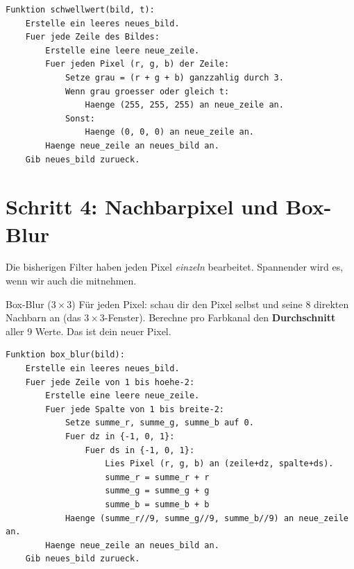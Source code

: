 \begin{lstlisting}[style=pseudo]
Funktion schwellwert(bild, t):
    Erstelle ein leeres neues_bild.
    Fuer jede Zeile des Bildes:
        Erstelle eine leere neue_zeile.
        Fuer jeden Pixel (r, g, b) der Zeile:
            Setze grau = (r + g + b) ganzzahlig durch 3.
            Wenn grau groesser oder gleich t:
                Haenge (255, 255, 255) an neue_zeile an.
            Sonst:
                Haenge (0, 0, 0) an neue_zeile an.
        Haenge neue_zeile an neues_bild an.
    Gib neues_bild zurueck.
\end{lstlisting}


\section{Schritt 4: Nachbarpixel und Box-Blur}

Die bisherigen Filter haben jeden Pixel \textit{einzeln} bearbeitet.
Spannender wird es, wenn wir auch die  mitnehmen.

\begin{definitionbox}{Box-Blur ($3\times 3$)}
F\"ur jeden Pixel: schau dir den Pixel selbst und seine 8 direkten Nachbarn
an (das $3\times 3$-Fenster). Berechne pro Farbkanal den \textbf{Durchschnitt}
aller 9 Werte. Das ist dein neuer Pixel.

\begin{center}
\end{center}
\end{definitionbox}

\begin{lstlisting}[style=pseudo]
Funktion box_blur(bild):
    Erstelle ein leeres neues_bild.
    Fuer jede Zeile von 1 bis hoehe-2:
        Erstelle eine leere neue_zeile.
        Fuer jede Spalte von 1 bis breite-2:
            Setze summe_r, summe_g, summe_b auf 0.
            Fuer dz in {-1, 0, 1}:
                Fuer ds in {-1, 0, 1}:
                    Lies Pixel (r, g, b) an (zeile+dz, spalte+ds).
                    summe_r = summe_r + r
                    summe_g = summe_g + g
                    summe_b = summe_b + b
            Haenge (summe_r//9, summe_g//9, summe_b//9) an neue_zeile an.
        Haenge neue_zeile an neues_bild an.
    Gib neues_bild zurueck.
\end{lstlisting}

